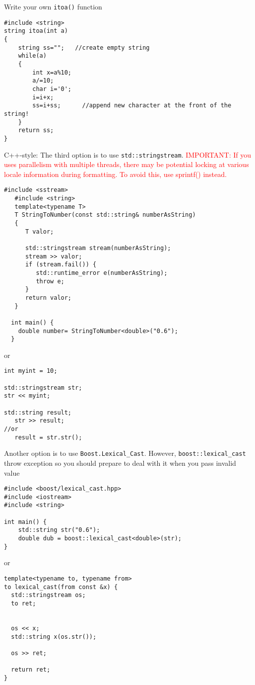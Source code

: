 Write your own \verb!itoa()! function
\begin{verbatim}
#include <string>
string itoa(int a)
{
    string ss="";   //create empty string
    while(a)
    {
        int x=a%10;
        a/=10;
        char i='0';
        i=i+x;
        ss=i+ss;      //append new character at the front of the string!
    }
    return ss;
}
\end{verbatim}

C++-style: The third option is to use \verb!std::stringstream!.
\textcolor{red}{IMPORTANT: If you uses parallelism with multiple threads, there
may be potential locking at various locale information during formatting. To
avoid this, use sprintf() instead.}
\begin{verbatim}
#include <sstream>
   #include <string>
   template<typename T>
   T StringToNumber(const std::string& numberAsString)
   {
      T valor;

      std::stringstream stream(numberAsString);
      stream >> valor;
      if (stream.fail()) {
         std::runtime_error e(numberAsString);
         throw e;
      }
      return valor;
   }
   
  int main() {
    double number= StringToNumber<double>("0.6");
  }
\end{verbatim}
or
\begin{verbatim}
int myint = 10;

std::stringstream str;
str << myint;

std::string result;
   str >> result;
//or
   result = str.str();   
\end{verbatim}


Another option is to use \verb!Boost.Lexical_Cast!. However,
\verb!boost::lexical_cast! throw exception so you should prepare to deal with it
when you pass invalid value
\begin{verbatim}
#include <boost/lexical_cast.hpp>
#include <iostream>
#include <string>

int main() {
    std::string str("0.6");
    double dub = boost::lexical_cast<double>(str);
}
\end{verbatim}
or
\begin{verbatim}
template<typename to, typename from>
to lexical_cast(from const &x) {
  std::stringstream os;
  to ret;


  os << x;
  std::string x(os.str());
  
  os >> ret;

  return ret;  
}
\end{verbatim}

